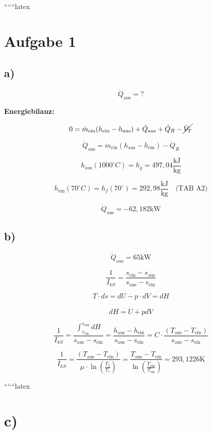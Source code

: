 
``````latex


\section*{Aufgabe 1}

\subsection*{a)}

\[
\dot{Q}_{\text{aus}} = ?
\]

\textbf{Energiebilanz:}

\[
0 = \dot{m}_{\text{ein}} (h_{\text{ein}} - h_{\text{aus}}) + \dot{Q}_{\text{aus}} + \dot{Q}_R - \cancel{\dot{V}_T}
\]

\[
\dot{Q}_{\text{aus}} = \dot{m}_{\text{ein}} (h_{\text{aus}} - h_{\text{ein}}) - \dot{Q}_R
\]

\[
h_{\text{aus}} (1000^\circ C) = h_g = 497,04 \frac{\text{kJ}}{\text{kg}}
\]

\[
h_{\text{ein}} (70^\circ C) = h_f (70^\circ) = 292,98 \frac{\text{kJ}}{\text{kg}} \quad \text{(TAB A2)}
\]

\[
\dot{Q}_{\text{aus}} = -62,182 \text{kW}
\]


\subsection*{b)}

\[
\dot{Q}_{\text{aus}} = 65 \text{kW}
\]

\[
\frac{1}{I_{kS}} = \frac{s_{\text{ein}} - s_{\text{aus}}}{s_{\text{aus}} - s_{\text{ein}}}
\]

\[
T \cdot ds = dU - p \cdot dV = dH
\]

\[
dH = \dot{U} + p dV
\]

\[
\frac{1}{I_{kS}} = \frac{\int_{s_{\text{ein}}}^{s_{\text{aus}}} dH}{s_{\text{aus}} - s_{\text{ein}}} = \frac{h_{\text{aus}} - h_{\text{ein}}}{s_{\text{aus}} - s_{\text{ein}}} = C \cdot \frac{(T_{\text{aus}} - T_{\text{ein}})}{s_{\text{aus}} - s_{\text{ein}}}
\]

\[
\frac{1}{I_{kS}} = \frac{(T_{\text{aus}} - T_{\text{ein}})}{\mu \cdot \ln \left( \frac{T_2}{T_1} \right)} = \frac{T_{\text{aus}} - T_{\text{ein}}}{\ln \left( \frac{T_{\text{aus}}}{T_{\text{ein}}} \right)} = 293,1226 \text{K}
\]

``````latex


\section*{c)}


